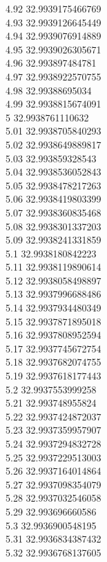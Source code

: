 {4.92	32.9939175466769\\
4.93	32.9939126645449\\
4.94	32.9939076914889\\
4.95	32.9939026305671\\
4.96	32.993897484781\\
4.97	32.9938922570755\\
4.98	32.99388695034\\
4.99	32.9938815674091\\
5	32.9938761110632\\
5.01	32.9938705840293\\
5.02	32.9938649889817\\
5.03	32.993859328543\\
5.04	32.9938536052843\\
5.05	32.9938478217263\\
5.06	32.9938419803399\\
5.07	32.9938360835468\\
5.08	32.9938301337203\\
5.09	32.9938241331859\\
5.1	32.9938180842223\\
5.11	32.9938119890614\\
5.12	32.9938058498897\\
5.13	32.9937996688486\\
5.14	32.9937934480349\\
5.15	32.9937871895018\\
5.16	32.9937808952594\\
5.17	32.9937745672754\\
5.18	32.9937682074755\\
5.19	32.9937618177443\\
5.2	32.9937553999258\\
5.21	32.993748955824\\
5.22	32.9937424872037\\
5.23	32.9937359957907\\
5.24	32.9937294832728\\
5.25	32.9937229513003\\
5.26	32.9937164014864\\
5.27	32.9937098354079\\
5.28	32.9937032546058\\
5.29	32.993696660586\\
5.3	32.9936900548195\\
5.31	32.9936834387432\\
5.32	32.9936768137605\\
}
